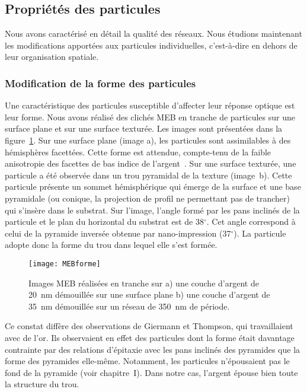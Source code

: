 	\subsection{Propriétés des particules}
Nous avons caractérisé en détail la qualité des réseaux. Nous étudions maintenant les modifications apportées aux particules individuelles, c'est-à-dire en dehors de leur organisation spatiale.\par 

\subsubsection{Modification de la forme des particules}
Une caractéristique des particules susceptible d'affecter leur réponse optique est leur forme. Nous avons réalisé des clichés MEB \og en tranche \fg{} de particules sur une surface plane et sur une surface texturée. Les images sont présentées dans la figure~\ref{MEBforme}. Sur une surface plane (image a), les particules sont assimilables à des hémisphères facettées. Cette forme est attendue, compte-tenu de la faible anisotropie des facettes de bas indice de l'argent~\cite{stankic2013equilibrium, winterbottom1967equilibrium}. Sur une surface texturée, une particule a été observée dans un trou pyramidal de la texture (image~b). Cette particule présente un sommet hémisphérique qui émerge de la surface et une base pyramidale (ou conique, la projection de profil ne permettant pas de trancher) qui s'insère dans le substrat. Sur l'image, l'angle formé par les pans inclinés de la particule et le plan du horizontal du substrat est de 38$^\circ$. Cet angle correspond à celui de la pyramide inversée obtenue par nano-impression (37$^\circ$). La particule adopte donc la forme du trou dans lequel elle s'est formée.\par
\begin{figure}[!htb]
\centering
\texttt{[image: MEBforme]}
\caption{Images MEB réalisées en tranche sur a) une couche d'argent de 20~nm démouillée sur une surface plane b) une couche d'argent de 35~nm démouillée sur un réseau de 350~nm de période.}
\label{MEBforme}
\end{figure}
Ce constat diffère des observations de Giermann et Thompson, qui travaillaient avec de l'or. Ils observaient en effet des particules dont la forme était davantage contrainte par des relations d'épitaxie avec les pans inclinés des pyramides que la forme des pyramides elle-même. Notamment, les particules n'épousaient pas le fond de la pyramide (voir chapitre~I). Dans notre cas, l'argent épouse bien toute la structure du trou.\par  

